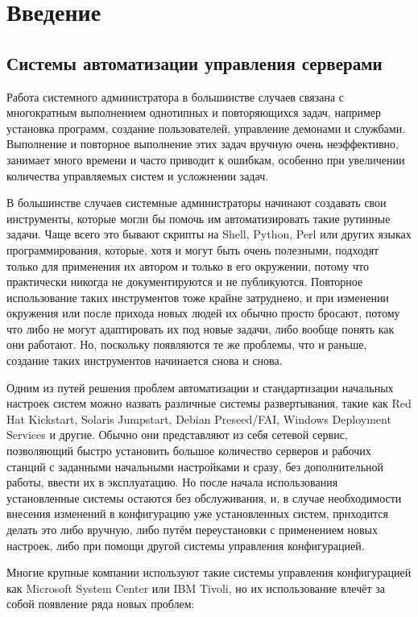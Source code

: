 \chapter{Введение}

\section{Системы автоматизации управления серверами}

Работа системного администратора в большинстве случаев связана с многократным выполнением однотипных и повторяющихся задач, например установка программ, создание пользователей, управление демонами и службами. Выполнение и повторное выполнение этих задач вручную очень неэффективно, занимает много времени и часто приводит к ошибкам, особенно при увеличении количества управляемых систем и усложнении задач.
	
В большинстве случаев системные администраторы начинают создавать свои инструменты, которые могли бы помочь им автоматизировать такие рутинные задачи. Чаще всего это бывают скрипты на Shell, Python, Perl или других языках программирования, которые, хотя и могут быть очень полезными, подходят только для применения их автором и только в его окружении, потому что практически никогда не документируются и не публикуются. Повторное использование таких инструментов тоже крайне затруднено, и при изменении окружения или после прихода новых людей их обычно просто бросают, потому что либо не могут адаптировать их под новые задачи, либо вообще понять как они работают. Но, поскольку появляются те же проблемы, что и раньше, создание таких инструментов начинается снова и снова.
	
Одним из путей решения проблем автоматизации и стандартизации начальных настроек систем можно назвать различные системы развертывания, такие как Red Hat Kickstart, Solaris Jumpstart, Debian Preseed/FAI, Windows Deployment Services и другие. Обычно они представляют из себя сетевой сервис, позволяющий быстро установить большое количество серверов и рабочих станций с заданными начальными настройками и сразу, без дополнительной работы, ввести их в эксплуатацию. Но после начала использования установленные системы остаются без обслуживания, и, в случае необходимости внесения изменений в конфигурацию уже установленных систем, приходится делать это либо вручную, либо путём переустановки с применением новых настроек, либо при помощи другой системы управления конфигурацией.
	
Многие крупные компании используют такие системы управления конфигурацией как Microsoft System Center или IBM Tivoli, но их использование влечёт за собой появление ряда новых проблем:

